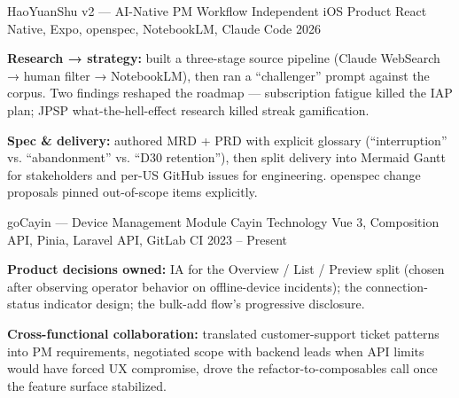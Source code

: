 
\begin{cventries}

\cventry
  {HaoYuanShu v2 — AI-Native PM Workflow}
  {Independent iOS Product}
  {React Native, Expo, openspec, NotebookLM, Claude Code}
  {2026}
  {
    \begin{cvitems}
      \item {\textbf{Research → strategy:} built a three-stage source pipeline (Claude WebSearch → human filter → NotebookLM), then ran a ``challenger'' prompt against the corpus. Two findings reshaped the roadmap — subscription fatigue killed the IAP plan; JPSP what-the-hell-effect research killed streak gamification.}
      \item {\textbf{Spec \& delivery:} authored MRD + PRD with explicit glossary (``interruption'' vs. ``abandonment'' vs. ``D30 retention''), then split delivery into Mermaid Gantt for stakeholders and per-US GitHub issues for engineering. openspec change proposals pinned out-of-scope items explicitly.}
    \end{cvitems}
  }

  \vspace{2mm}

\cventry
  {goCayin — Device Management Module}
  {Cayin Technology}
  {Vue 3, Composition API, Pinia, Laravel API, GitLab CI}
  {2023 -- Present}
  {
    \begin{cvitems}
      \item {\textbf{Product decisions owned:} IA for the Overview / List / Preview split (chosen after observing operator behavior on offline-device incidents); the connection-status indicator design; the bulk-add flow's progressive disclosure.}
      \item {\textbf{Cross-functional collaboration:} translated customer-support ticket patterns into PM requirements, negotiated scope with backend leads when API limits would have forced UX compromise, drove the refactor-to-composables call once the feature surface stabilized.}
    \end{cvitems}
  }

\end{cventries}
